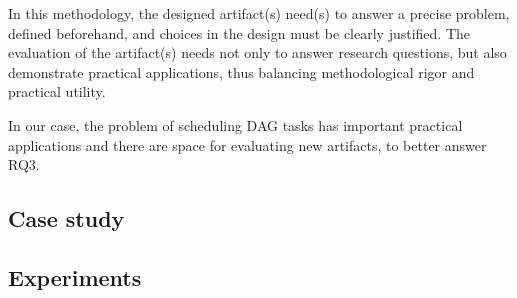 In this methodology,
the designed artifact(s) need(s) to answer a precise problem,
defined beforehand, and choices in the design must be clearly justified.
The evaluation of the artifact(s) needs not only to answer research questions, but also
demonstrate practical applications,
thus balancing methodological rigor and practical utility.

In our case, the problem of scheduling DAG tasks
has important practical applications and there are space 
for evaluating new artifacts, to better answer RQ3.

\subsection{Case study}

\subsection{Experiments}
 
 


